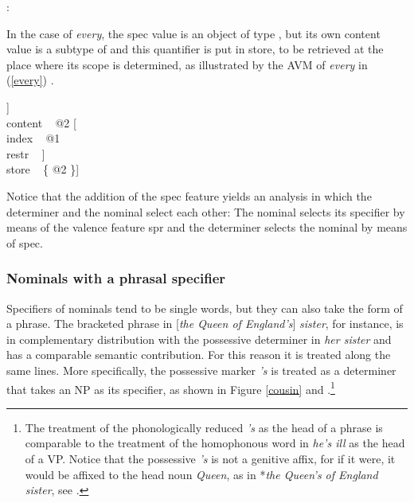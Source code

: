 \documentclass[output=paper]{langsci/langscibook}
\begin{document}
\begin{exe} 
\ex   {}: \begin{avm}  \end{avm}  
\end{exe} 

\noindent
In the case of \emph{every}, the {\sc spec} value is an object of 
type , but its own {\sc content} value is a subtype of 
 and this quantifier is put in store, to be retrieved 
at the place where its scope is determined, as illustrated by the AVM
of \emph{every} in (\ref{every}) \citep[204]{GS00}.  

\begin{exe} 
\ex\label{every} 
\begin{avm}
[cat|head [\type{det}               \\
           spec [\type{parameter}   \\
                 index ~ @1          \\
                 restr ~ \avmbox{$\Sigma$} ]] \\
 content ~ @2 [     \\
               index ~ @1            \\
               restr ~ \avmbox{$\Sigma$} ] \\
 store ~ \{ @2 \}]
\end{avm}
\end{exe}

\noindent 
Notice that the addition of the {\sc spec} feature yields an analysis in which the determiner 
and the nominal select each other: The nominal selects 
its specifier by means of the valence feature {\sc spr} and the determiner selects the nominal 
by means of {\sc spec}.  


\subsubsection{Nominals with a phrasal specifier} 


Specifiers of nominals tend to be single words, but they can also take the form 
of a phrase. The bracketed phrase in [\emph{the Queen of England's}] \emph{sister},
for instance, is in complementary distribution with the possessive
determiner in \emph{her sister} and has a comparable semantic contribution.   
For this reason it is treated along the same lines. More specifically, the 
possessive marker \emph{'s} is treated as a determiner that takes an NP as its specifier, 
as shown in Figure \ref{cousin} \citep[51--54]{ps2} and \citep[193]{GS00}.\footnote{The treatment 
of the phonologically reduced \emph{'s} as the head of a phrase is comparable to 
the treatment of the homophonous word in \emph{he's ill} as the head of a VP.
Notice that the possessive \emph{'s} is not a genitive affix, for if it were, it 
would be affixed to the head noun \emph{Queen}, as in *\emph{the Queen's of England sister}, see  
\citet[199]{SagWasow03}.}
\end{document}
